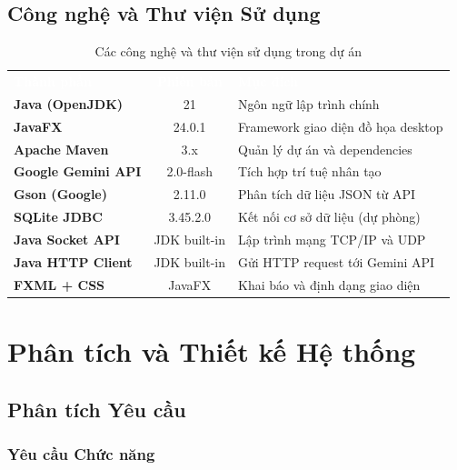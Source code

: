 \documentclass[12pt, a4paper, oneside]{report}
\newcommand{\rA}{\rowcolor{rowA}}
\newcommand{\rB}{\rowcolor{rowB}}
\begin{document}
\section{Công nghệ và Thư viện Sử dụng}

\begin{table}[H]
  \centering
  \caption{Các công nghệ và thư viện sử dụng trong dự án}
  \label{tab:tech}
  \begin{tabularx}{\linewidth}{>{\bfseries\color{hustblue}}l c X}
    \rowcolor{headerrow}
    \textcolor{white}{\textbf{Thành phần}} &
    \textcolor{white}{\textbf{Phiên bản}} &
    \textcolor{white}{\textbf{Mục đích}} \\
    \rA Java (OpenJDK)      & 21        & Ngôn ngữ lập trình chính \\
    \rB JavaFX              & 24.0.1    & Framework giao diện đồ họa desktop \\
    \rA Apache Maven        & 3.x       & Quản lý dự án và dependencies \\
    \rB Google Gemini API   & 2.0-flash & Tích hợp trí tuệ nhân tạo \\
    \rA Gson (Google)       & 2.11.0    & Phân tích dữ liệu JSON từ API \\
    \rB SQLite JDBC         & 3.45.2.0  & Kết nối cơ sở dữ liệu (dự phòng) \\
    \rA Java Socket API     & JDK built-in & Lập trình mạng TCP/IP và UDP \\
    \rB Java HTTP Client    & JDK built-in & Gửi HTTP request tới Gemini API \\
    \rA FXML + CSS          & JavaFX    & Khai báo và định dạng giao diện \\
  \end{tabularx}
\end{table}

\chapter{Phân tích và Thiết kế Hệ thống}

\section{Phân tích Yêu cầu}

\subsection{Yêu cầu Chức năng}
\end{document}
